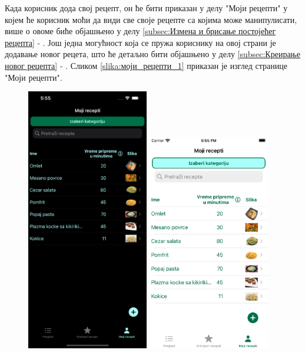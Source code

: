 \documentclass[12pt,oneside]{memoir}
\begin{document}
\indent Када корисник дода свој рецепт, он ће бити приказан у делу "Моји рецепти" у којем ће корисник моћи да види све своје рецепте са којима може манипулисати, више о овоме биће објашњено у делу \ref{subsec:Измена и брисање постојећег рецепта} - . Још једна могућност која се пружа кориснику на овој страни је додавање новог рецета, што ће детаљно бити објашњено у делу \ref{subsec:Креирање новог рецепта} - . Сликом \ref{slika:моји_рецепти_1} приказан је изглед странице "Моји рецепти".

\begin{figure} [H]
    \centering
    \captionsetup{justification=centering}
    \includegraphics[width=0.475\textwidth]{images/simulators/view images/dark - my recipes.png} 
    \hfill
    \includegraphics[width=0.475\textwidth]{images/simulators/view images/light - my recipes.png}

\end{figure}
\end{document}

